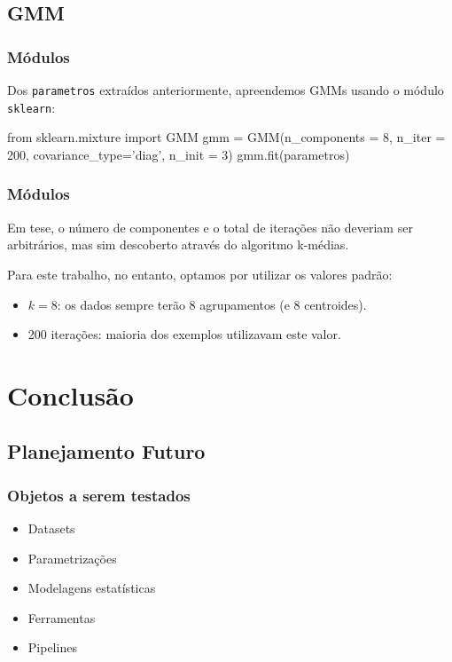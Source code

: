 \documentclass{beamer}
\begin{document}
\subsection{GMM}

\begin{frame}[fragile] %
    \frametitle{Módulos}

    Dos \texttt{parametros} extraídos anteriormente, apreendemos GMMs usando o módulo \texttt{sklearn}:

    \bigskip
    \begin{python}
from sklearn.mixture import GMM
gmm = GMM(n_components = 8, n_iter = 200, covariance_type='diag', n_init = 3)
gmm.fit(parametros)
    \end{python}

\end{frame}

\begin{frame}[fragile] %
    \frametitle{Módulos}

    Em tese, o número de componentes e o total de iterações não deveriam ser arbitrários, mas sim descoberto através do algoritmo k-médias. 

    Para este trabalho, no entanto, optamos por utilizar os valores padrão:

    \begin{itemize}
        \item $k = 8$: os dados sempre terão 8 agrupamentos (e 8 centroides).
        \item 200 iterações: maioria dos exemplos utilizavam este valor.
    \end{itemize}

\end{frame}

\section{Conclusão}

\subsection{Planejamento Futuro}

\begin{frame}
    \frametitle{Objetos a serem testados}

    \begin{itemize}
        \item Datasets
        \item Parametrizações
        \item Modelagens estatísticas
        \item Ferramentas
        \item Pipelines
    \end{itemize}

\end{frame}
\end{document}
